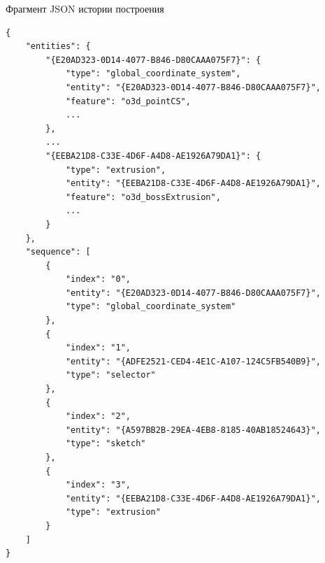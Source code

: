 

\begin{center}
{\selectfont Фрагмент JSON истории построения}
\end{center}

\begin{lstlisting}
{
    "entities": {
        "{E20AD323-0D14-4077-B846-D80CAAA075F7}": {
            "type": "global_coordinate_system",
            "entity": "{E20AD323-0D14-4077-B846-D80CAAA075F7}",
            "feature": "o3d_pointCS",
            ...
        },
        ...
        "{EEBA21D8-C33E-4D6F-A4D8-AE1926A79DA1}": {
            "type": "extrusion",
            "entity": "{EEBA21D8-C33E-4D6F-A4D8-AE1926A79DA1}",
            "feature": "o3d_bossExtrusion",
            ...
        }
    },
    "sequence": [
        {
            "index": "0",
            "entity": "{E20AD323-0D14-4077-B846-D80CAAA075F7}",
            "type": "global_coordinate_system"
        },
        {
            "index": "1",
            "entity": "{ADFE2521-CED4-4E1C-A107-124C5FB540B9}",
            "type": "selector"
        },
        {
            "index": "2",
            "entity": "{A597BB2B-29EA-4EB8-8185-40AB18524643}",
            "type": "sketch"
        },
        {
            "index": "3",
            "entity": "{EEBA21D8-C33E-4D6F-A4D8-AE1926A79DA1}",
            "type": "extrusion"
        }
    ]
}
\end{lstlisting}


